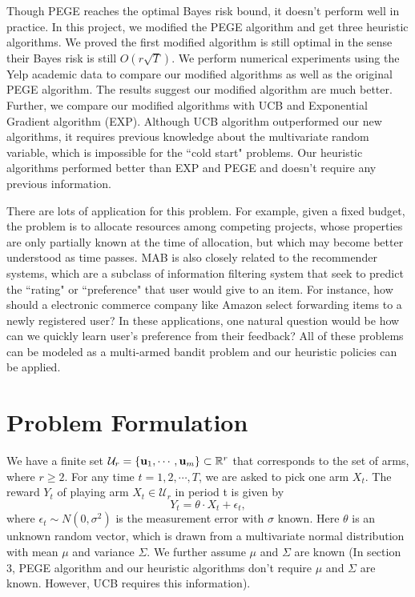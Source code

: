 \documentclass{article}
\theoremstyle{plain}
\theoremstyle{definition}
\begin{document}
Though PEGE reaches the optimal Bayes risk bound, it doesn't perform well in practice. In this project, we modified the PEGE algorithm and get three heuristic algorithms. We proved the first modified algorithm is still optimal in the sense their Bayes risk is still $O(r\sqrt{T})$. We perform numerical experiments using the Yelp academic data to compare our modified algorithms as well as the original PEGE algorithm. The results suggest our modified algorithm are much better. Further, we compare our modified algorithms with UCB and Exponential Gradient algorithm (EXP). Although UCB algorithm outperformed our new algorithms, it requires previous knowledge about the multivariate random variable, which is impossible for the ``cold start" problems. Our heuristic algorithms performed better than EXP and PEGE and doesn't require any previous information.

There are lots of application for this problem. For example, given a fixed budget, the problem is to allocate resources among competing projects, whose properties are only partially known at the time of allocation, but which may become better understood as time passes. MAB is also closely related to the recommender systems, which are a subclass of information filtering system that seek to predict the ``rating" or ``preference" that user would give to an item. For instance, how should a electronic commerce company like Amazon select forwarding items to a newly registered user? In these applications, one natural question would be how can we quickly learn user's preference from their feedback? All of these problems can be modeled as a multi-armed bandit problem and our heuristic policies can be applied.





\section{Problem Formulation}
We have a finite set $\mathcal{U}_{r}=\{\bold{u}_{1},\cdots,\bold{u}_{m}\}\subset \mathbb{R}^{r}$ that corresponds to the set of arms, where $r\geq 2$. For any time $t=1,2,\cdots,T$, we are asked to pick one arm $X_{t}$. The reward $Y_{t}$ of playing arm $X_{t}\in \mathcal{U}_{r}$ in period t is given by
\begin{equation}
Y_{t} = \theta \cdot X_{t} + \epsilon_{t}, \nonumber
\end{equation}
where $\epsilon_{t}\sim N(0,\sigma^{2})$ is the measurement error with $\sigma$ known. Here $\theta$ is an unknown random vector, which is drawn from a multivariate normal distribution with mean $\mu$ and variance $\Sigma$. We further assume $\mu$ and $\Sigma$ are known (In section 3, PEGE algorithm and our heuristic algorithms don't require $\mu$ and $\Sigma$ are known. However, UCB requires this information).
\end{document}
